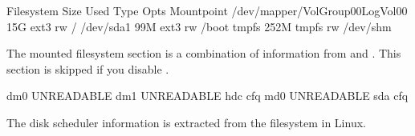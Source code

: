 \documentclass[letterpaper,10pt,english]{sphinxmanual}
\begin{document}
\begin{sphinxVerbatim}[commandchars=\\\{\}]
  Filesystem                       Size Used Type  Opts Mountpoint
  /dev/mapper/VolGroup00\PYGZhy{}LogVol00   15G  \PYGZpc{} ext3  rw   /
  /dev/sda1                         99M  \PYGZpc{} ext3  rw   /boot
  tmpfs                            252M   \PYGZpc{} tmpfs rw   /dev/shm
\end{sphinxVerbatim}

The mounted filesystem section is a combination of information from  and
. This section is skipped if you disable {\hyperref[\detokenize{mariadb-system-summary:cmdoption-mariadb-system-summary-summarize-mounts}]{}}.

\begin{sphinxVerbatim}[commandchars=\\\{\}]
        dm\PYGZhy{}0  UNREADABLE
        dm\PYGZhy{}1  UNREADABLE
         hdc  \PYG{o}{[}cfq\PYG{o}{]} 
         md0  UNREADABLE
         sda  \PYG{o}{[}cfq\PYG{o}{]} 
\end{sphinxVerbatim}

The disk scheduler information is extracted from the  filesystem in
Linux.
\end{document}
